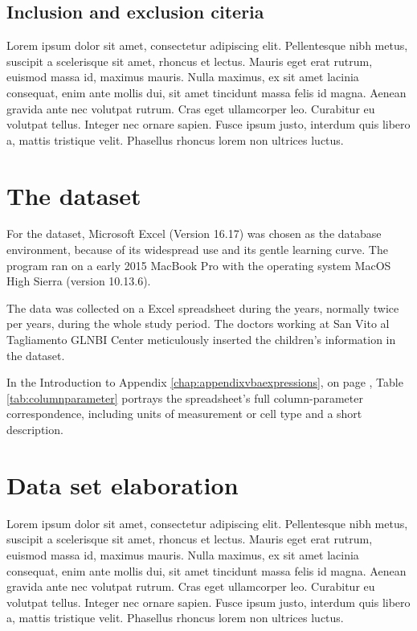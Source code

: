 \subsection{Inclusion and exclusion citeria}\label{sub:inclusionandexclusionciteria}
Lorem ipsum dolor sit amet, consectetur adipiscing elit. Pellentesque nibh metus, suscipit a scelerisque sit amet, rhoncus et lectus. Mauris eget erat rutrum, euismod massa id, maximus mauris. Nulla maximus, ex sit amet lacinia consequat, enim ante mollis dui, sit amet tincidunt massa felis id magna. Aenean gravida ante nec volutpat rutrum. Cras eget ullamcorper leo. Curabitur eu volutpat tellus. Integer nec ornare sapien. Fusce ipsum justo, interdum quis libero a, mattis tristique velit. Phasellus rhoncus lorem non ultrices luctus.


\section{The dataset}\label{sec:dataset}
For the dataset, Microsoft Excel (Version 16.17) was chosen as the database environment, because of its widespread use and its gentle learning curve. The program ran on a early 2015 MacBook Pro with the operating system MacOS High Sierra (version 10.13.6).

The data was collected on a Excel spreadsheet during the years, normally twice per years, during the whole study period. The doctors working at San Vito al Tagliamento GLNBI Center meticulously inserted the children's information in the dataset.

In the Introduction to Appendix \ref{chap:appendixvbaexpressions}, on page \pageref{chap:appendixvbaexpressions}, Table \ref{tab:columnparameter} portrays the spreadsheet's full column-parameter correspondence, including units of measurement or cell type and a short description.

\section{Data set elaboration}\label{sec:datasetelaboration}
Lorem ipsum dolor sit amet, consectetur adipiscing elit. Pellentesque nibh metus, suscipit a scelerisque sit amet, rhoncus et lectus. Mauris eget erat rutrum, euismod massa id, maximus mauris. Nulla maximus, ex sit amet lacinia consequat, enim ante mollis dui, sit amet tincidunt massa felis id magna. Aenean gravida ante nec volutpat rutrum. Cras eget ullamcorper leo. Curabitur eu volutpat tellus. Integer nec ornare sapien. Fusce ipsum justo, interdum quis libero a, mattis tristique velit. Phasellus rhoncus lorem non ultrices luctus.

